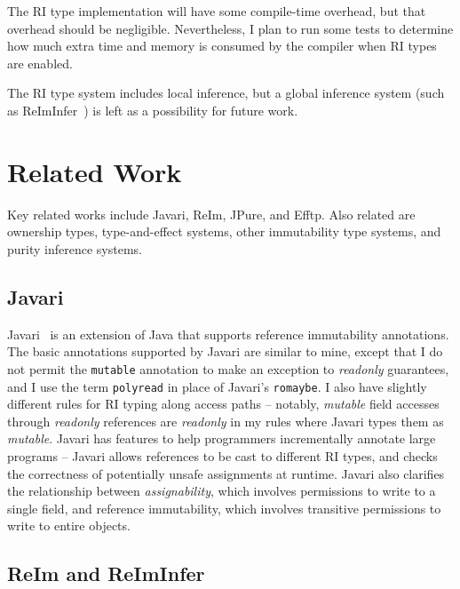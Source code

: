 \documentclass[letterpaper,11pt]{article}
\newcommand{\code}[1]{\lstinline$#1$}
\theoremstyle{definition}
\theoremstyle{remark}
\begin{document}
The RI type implementation will have some compile-time overhead, but
that overhead should be negligible.
Nevertheless, I plan to run some tests to determine how much extra time
and memory is consumed by the compiler when RI types are enabled.

The RI type system includes local inference, but
a global inference system
(such as ReImInfer~\cite{reim})
is left as a possibility for future work.

\section{Related Work}
\label{related-work}

Key related works include Javari, ReIm, JPure, and Efftp.
Also related are ownership types, type-and-effect systems,
other immutability type systems, and purity inference systems.


\subsection{Javari}

Javari~\cite{javari} is an extension of Java that supports reference immutability annotations.
The basic annotations supported by Javari are similar to mine, except that
I do not permit the \code{mutable} annotation to make an exception to
\emph{readonly} guarantees,
and I use the term \code{polyread} in place of Javari's \code{romaybe}.
I also have slightly different rules for RI typing along access paths --
notably, \emph{mutable} field accesses through \emph{readonly}
references are \emph{readonly} in my rules where Javari types them as \emph{mutable}.
Javari has features to help programmers incrementally annotate large programs --
Javari allows references to be cast to different RI types,
and checks the correctness of potentially unsafe assignments at runtime.
Javari also clarifies the relationship between \emph{assignability},
which involves permissions to write to a single field, and
reference immutability, which involves transitive permissions to
write to entire objects.

\subsection{ReIm and ReImInfer}
\end{document}
